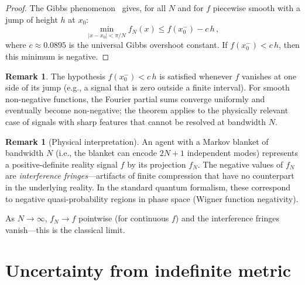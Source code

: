 \documentclass[12pt,a4paper]{article}
\theoremstyle{definition}
\newtheorem{remark}[theorem]{Remark}
\begin{document}
\begin{proof}
The Gibbs phenomenon~\cite{Gibbs1898,HewittHewitt1979} gives, for all
$N$ and for $f$ piecewise smooth with a jump of height $h$ at $x_0$:
\begin{equation}
  \min_{|x - x_0| < \pi/N} f_N(x)
  \leq f(x_0^-) - c\,h\,,
\end{equation}
where $c \approx 0.0895$ is the universal Gibbs overshoot constant.
If $f(x_0^-) < c\, h$, then this minimum is negative.
\end{proof}

\begin{remark}
The hypothesis $f(x_0^-) < c\,h$ is satisfied whenever $f$ vanishes
at one side of its jump (e.g., a signal that is zero outside a finite
interval). For smooth non-negative functions, the Fourier partial sums
converge uniformly and eventually become non-negative; the theorem
applies to the physically relevant case of signals with sharp features
that cannot be resolved at bandwidth $N$.
\end{remark}

\begin{remark}[Physical interpretation]
An agent with a Markov blanket of bandwidth $N$ (i.e., the blanket
can encode $2N+1$ independent modes) represents a positive-definite
reality signal $f$ by its projection $f_N$. The negative values of
$f_N$ are \emph{interference fringes}---artifacts of finite
compression that have no counterpart in the underlying reality. In the
standard quantum formalism, these correspond to negative quasi-probability
regions in phase space (Wigner function negativity).

As $N \to \infty$, $f_N \to f$ pointwise (for continuous $f$) and the
interference fringes vanish---this is the classical limit.
\end{remark}

\section{Uncertainty from indefinite metric}
\label{sec:uncertainty}
\end{document}
